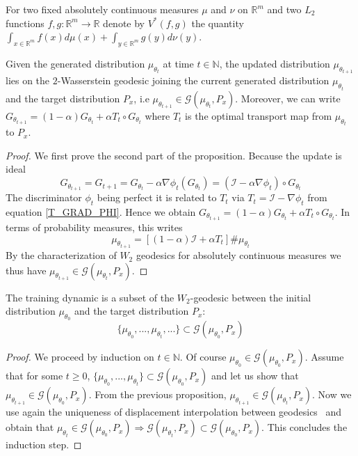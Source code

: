 \documentclass[runningheads]{llncs}
\newcommand{\id}{\mathcal{I}}
\begin{document}
For two fixed absolutely continuous measures $\mu$ and $\nu$ on $\mathds{R}^m$ and two $L_2$ functions $f,g:\mathds{R}^m \rightarrow \mathds{R}$ denote by $V^*(f,g)$ the quantity $\int_{x \in \mathds{R}^m} f(x)d\mu(x)+\int_{y \in \mathds{R}^m} g(y)d\nu(y)$. 
\begin{proposition}
\normalfont
Given the generated distribution $\mu_{\theta_t}$ at time $t\in \mathds{N}$, the updated distribution $\mu_{\theta_{t+1}}$ lies on the $2$-Wasserstein geodesic joining the current generated distribution $\mu_{\theta_t}$ and the target distribution $P_x$, i.e $\mu_{\theta_{t+1}}\in \mathcal{G}(\mu_{\theta_t},P_x)$. Moreover, we can write $G_{\theta_{t+1}}=(1-\alpha)G_{\theta_{t}}+ \alpha T_t \circ G_{\theta_{t}}$ where $T_t$ is the optimal transport map from $\mu_{\theta_t}$ to $P_x$.
\label{local_update}
\end{proposition}
\begin{proof}
We first prove the second part of the proposition. Because the update is ideal \[G_{\theta_{t+1}}=G_{t+1}=G_{\theta_{t}}-\alpha\nabla \phi_t(G_{\theta_{t}})= (\id-\alpha\nabla \phi_t)\circ G_{\theta_{t}}\]
The discriminator $\phi_t$ being perfect it is related to $T_t$ via $T_t= \id-\nabla \phi_t$ from equation \ref{T_GRAD_PHI}. Hence we obtain $G_{\theta_{t+1}}=(1-\alpha)G_{\theta_{t}}+ \alpha T_t \circ G_{\theta_{t}}$. In terms of probability measures, this writes 
\[\mu_{\theta_{t+1}}=[(1-\alpha)\id+ \alpha T_t]\# \mu_{\theta_t}\]
By the characterization of $W_2$ geodesics for absolutely continuous measures we thus have $\mu_{\theta_{t+1}}\in \mathcal{G}(\mu_{\theta_t},P_x)$.
\end{proof}

\begin{proposition}
\normalfont
\label{global_evolution_generated_distrib}
The training dynamic is a subset of the $W_2$-geodesic between the initial distribution $\mu_{\theta_0}$ and the target distribution $P_x$:
\[\{\mu_{\theta_0},...,\mu_{\theta_t},...\} \subset \mathcal{G}(\mu_{\theta_0},P_x)\] 
\end{proposition}
\begin{proof}
We proceed by induction on $t\in \mathds{N}$. Of course $\mu_{\theta_0}\in \mathcal{G}(\mu_{\theta_0},P_x)$. Assume that for some $t\geqslant 0$, $\{\mu_{\theta_0},...,\mu_{\theta_t}\} \subset \mathcal{G}(\mu_{\theta_0},P_x)$ and let us show that $\mu_{\theta_{t+1}}\in \mathcal{G}(\mu_{\theta_0},P_x)$. From the previous proposition, $\mu_{\theta_{t+1}}\in \mathcal{G}(\mu_{\theta_t},P_x)$. Now we use again the uniqueness of displacement interpolation between geodesics~\citep{Villani} and obtain that $\mu_{\theta_t}\in \mathcal{G}(\mu_{\theta_0},P_x) \Rightarrow \mathcal{G}(\mu_{\theta_t},P_x) \subset \mathcal{G}(\mu_{\theta_0},P_x)$. This concludes the induction step. 
\end{proof}
\end{document}

